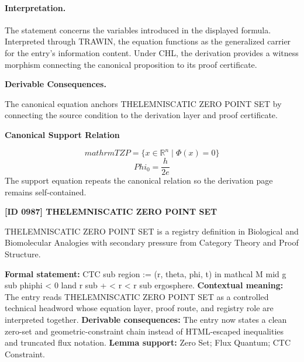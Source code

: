 \paragraph{Interpretation.}
The statement concerns the variables introduced in the displayed formula. Interpreted through TRAWIN, the equation functions as the generalized carrier for the entry’s information content. Under CHL, the derivation provides a witness morphism connecting the canonical proposition to its proof certificate.

\par\vspace{0.35em}
\noindent\textbf{Derivable Consequences.}\quad
\begingroup
\footnotesize
\raggedright
The canonical equation anchors THELEMNISCATIC ZERO POINT SET by connecting the source condition to the derivation layer and proof certificate.
\par\endgroup

\noindent\textbf{Canonical Support Relation}\par
\[
mathrm{TZP}=\{x\in\mathbb{R}^{n}\mid \Phi(x)=0\}
\]
\[
Phi_{0}=\frac{h}{2e}
\]
\noindent The support equation repeats the canonical relation so the derivation page remains self-contained.\par

\clearpage
\noindent\textbf{[ID 0987] THELEMNISCATIC ZERO POINT SET}\par
\vspace{0.35em}
\begingroup\small
{}
THELEMNISCATIC ZERO POINT SET is a registry definition in Biological and Biomolecular Analogies with secondary pressure from Category Theory and Proof Structure.

\begingroup\footnotesize\setlength{\emergencystretch}{3em}\sloppy
\textbf{Formal statement:} CTC sub region := (r, theta, phi, t) in mathcal M mid g sub phiphi < 0 land r sub + < r < r sub ergosphere. \textbf{Contextual meaning:} The entry reads THELEMNISCATIC ZERO POINT SET as a controlled technical headword whose equation layer, proof route, and registry role are interpreted together. \textbf{Derivable consequences:} The entry now states a clean zero-set and geometric-constraint chain instead of HTML-escaped inequalities and truncated flux notation. \textbf{Lemma support:} Zero Set; Flux Quantum; CTC Constraint.\par
\endgroup

